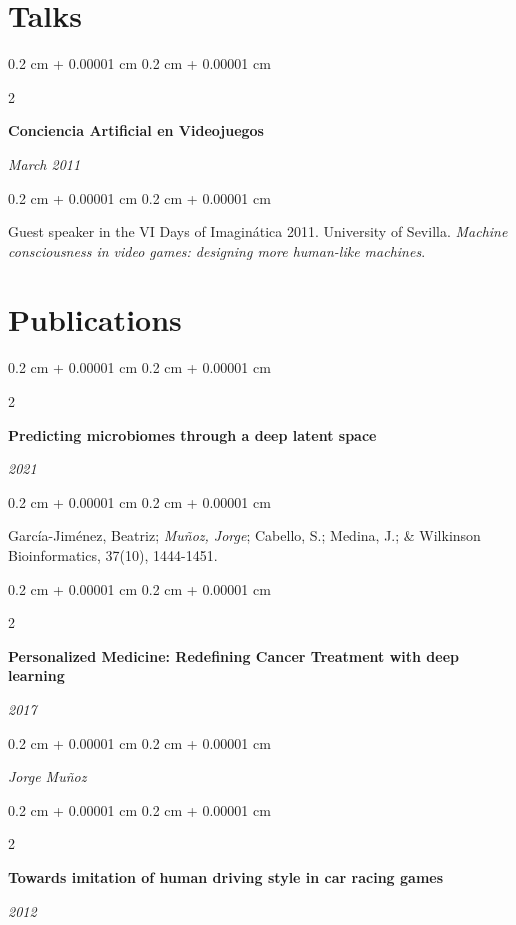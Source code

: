 \documentclass[10pt, letterpaper]{article}
\newenvironment{onecolentry}{
	\begin{adjustwidth}{
		0.2 cm + 0.00001 cm
	}{
		0.2 cm + 0.00001 cm
	}
	}{
	\end{adjustwidth}
} %
\newenvironment{twocolentry}[2][]{
	\onecolentry
	\def\secondColumn{#2}
	\setcolumnwidth{\fill, 5.5 cm}
	\begin{paracol}{2}
	}{
		\switchcolumn \raggedleft \secondColumn
	\end{paracol}
	\endonecolentry
} %
\begin{document}
	\section{Talks}

	\begin{twocolentry}{
		\textit{March 2011}}
		\textbf{Conciencia Artificial en Videojuegos}
	\end{twocolentry}

	\vspace{0.10 cm}
	\begin{onecolentry}
		Guest speaker in the VI Days of Imaginática 2011. University of Sevilla. \textit{Machine consciousness in video games: designing more human-like machines}.
	\end{onecolentry}


	\section{Publications}

	\begin{twocolentry}{
		\textit{2021}}
		\textbf{Predicting microbiomes through a deep latent space}
	\end{twocolentry}

	\vspace{0.10 cm}
	\begin{onecolentry}
		García-Jiménez, Beatriz; \textit{Muñoz, Jorge}; Cabello, S.; Medina, J.; \& Wilkinson\\
		Bioinformatics, 37(10), 1444-1451.
	\end{onecolentry}

	\vspace{0.2 cm}

	\begin{twocolentry}{
		\textit{2017}}
		\textbf{Personalized Medicine: Redefining Cancer Treatment with deep learning}
	\end{twocolentry}

	\vspace{0.10 cm}
	\begin{onecolentry}
		\textit{Jorge Muñoz}
	\end{onecolentry}

	\vspace{0.2 cm}

	\begin{twocolentry}{
		\textit{2012}}
		\textbf{Towards imitation of human driving style in car racing games}
	\end{twocolentry}
\end{document}
